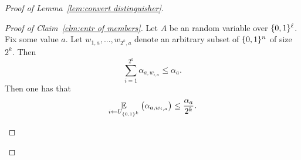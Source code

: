 \begin{proof}[Proof of Lemma~\ref{lem:convert distinguisher}]
\begin{claim}
\label{clm:entr of members}
\end{claim}

\begin{proof}[Proof of Claim~\ref{clm:entr of members}]
Let $A$ be an random variable over $\{0, 1\}^\ell$.
Fix some value $a$.  Let $w_{1, a},...,w_{2^k, a}$ denote an arbitrary subset of $\{0, 1\}^n$ of  size $2^k$. Then 
\[
\sum_{i=1}^{2^k} \alpha_{a, w_{i,a}}\le \alpha_a.
\]
Then one has that 
\[\operatorname*{\mathbb{E}}_{i\leftarrow U_{\{0, 1\}^k}} \left(\alpha_{a, w_{i,a}} \right)\le \frac{\alpha_a}{2^k}.\]

\label{clm:entropy distributes}


\end{proof}
\end{proof}
